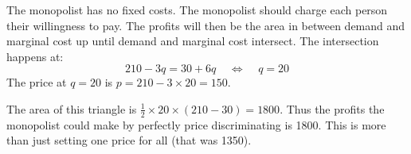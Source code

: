 \documentclass[12pt]{article}
\newcounter{question}[section]
\newenvironment{subquestions}{
  \begin{enumerate}[label=(\roman*)]}{\end{enumerate}}
\begin{document}
\begin{subquestions}
    \textcolor{solution-color}{
      The monopolist has no fixed costs. The monopolist should charge each
      person their willingness to pay. The profits will then be the area in
      between demand and marginal cost up until demand and marginal cost
      intersect. The intersection happens at:
      \[
        210-3q= 30+6q \;\;\;\;\Longleftrightarrow \;\;\;\;
        q=20
      \]
      The price at $q=20$ is $p=210-3\times 20 = 150$.
      \begin{center}
      \end{center}
      The area of this triangle is $\frac{1}{2}\times 20 \times \left( 210-30
      \right)=1800$. Thus the profits the monopolist could make by perfectly
      price discriminating is 1800. This is more than just setting one price
      for all (that was 1350).
    }
\end{subquestions}
\end{document}
